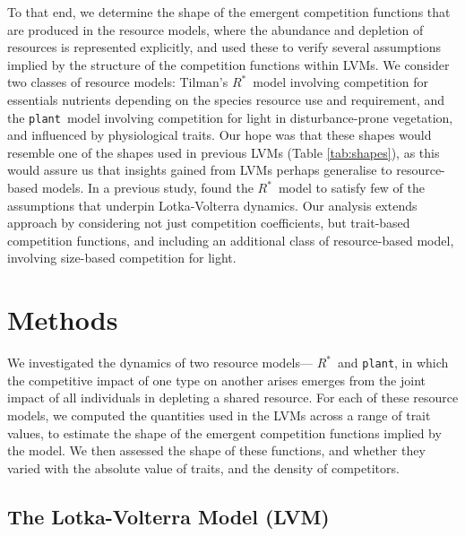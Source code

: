\documentclass[a4paper,11pt]{article}
\newcommand{\Rstar}{\ensuremath{R^*}}
\newcommand{\plant}{{\tt plant}}
\begin{document}
To that end, we determine the shape of the emergent competition functions that are produced in the resource models, where the abundance and depletion of resources is represented explicitly, and used these to verify several assumptions implied by the structure of the competition functions within LVMs. We consider two classes of resource models: Tilman's \Rstar\ model involving competition for essentials nutrients depending on the species resource use and requirement, and the \plant\ model involving competition for light in disturbance-prone vegetation, and influenced by physiological traits. Our hope was that these shapes would resemble one of the shapes used in previous LVMs (Table \ref{tab:shapes}), as this would assure us that insights gained from LVMs perhaps generalise to resource-based models. In a previous study, \citet{Abrams-2008} found the \Rstar\ model to satisfy few of the assumptions that underpin Lotka-Volterra dynamics. Our analysis extends \citeauthor{Abrams-2008} approach by considering not just competition coefficients, but trait-based competition functions, and including an additional class of resource-based model, involving size-based competition for light.

\section{Methods}

We investigated the dynamics of two resource models--- \Rstar\  and \plant, in which the competitive impact of one type on another arises emerges from the joint impact of all individuals in depleting a shared resource. For each of these resource models, we computed the quantities used in the LVMs across a range of trait values, to estimate the shape of the emergent competition functions implied by the model. We then assessed the shape of these functions, and whether they varied with the absolute value of traits, and the density of competitors.

\subsection{The Lotka-Volterra Model (LVM)}
\end{document}
